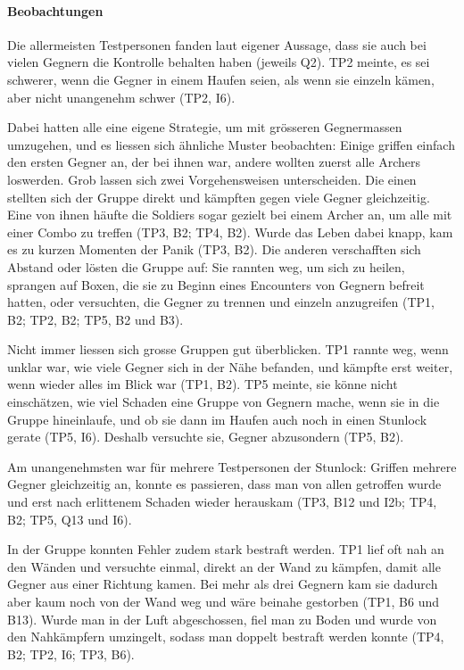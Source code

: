 \documentclass[../Main.tex]{subfiles}
\begin{document}
\paragraph{Beobachtungen}
Die allermeisten Testpersonen fanden laut eigener Aussage, dass sie auch bei vielen Gegnern die Kontrolle behalten haben (jeweils Q2). TP2 meinte, es sei schwerer, wenn die Gegner in einem Haufen seien, als wenn sie einzeln kämen, aber nicht unangenehm schwer (TP2, I6).

Dabei hatten alle eine eigene Strategie, um mit grösseren Gegnermassen umzugehen, und es liessen sich ähnliche Muster beobachten: Einige griffen einfach den ersten Gegner an, der bei ihnen war, andere wollten zuerst alle Archers loswerden. Grob lassen sich zwei Vorgehensweisen unterscheiden. Die einen stellten sich der Gruppe direkt und kämpften gegen viele Gegner gleichzeitig. Eine von ihnen häufte die Soldiers sogar gezielt bei einem Archer an, um alle mit einer Combo zu treffen (TP3, B2; TP4, B2). Wurde das Leben dabei knapp, kam es zu kurzen Momenten der Panik (TP3, B2). Die anderen verschafften sich Abstand oder lösten die Gruppe auf: Sie rannten weg, um sich zu heilen, sprangen auf Boxen, die sie zu Beginn eines Encounters von Gegnern befreit hatten, oder versuchten, die Gegner zu trennen und einzeln anzugreifen (TP1, B2; TP2, B2; TP5, B2 und B3).

Nicht immer liessen sich grosse Gruppen gut überblicken. TP1 rannte weg, wenn unklar war, wie viele Gegner sich in der Nähe befanden, und kämpfte erst weiter, wenn wieder alles im Blick war (TP1, B2). TP5 meinte, sie könne nicht einschätzen, wie viel Schaden eine Gruppe von Gegnern mache, wenn sie in die Gruppe hineinlaufe, und ob sie dann im Haufen auch noch in einen Stunlock gerate (TP5, I6). Deshalb versuchte sie, Gegner abzusondern (TP5, B2).

Am unangenehmsten war für mehrere Testpersonen der Stunlock: Griffen mehrere Gegner gleichzeitig an, konnte es passieren, dass man von allen getroffen wurde und erst nach erlittenem Schaden wieder herauskam (TP3, B12 und I2b; TP4, B2; TP5, Q13 und I6).

In der Gruppe konnten Fehler zudem stark bestraft werden. TP1 lief oft nah an den Wänden und versuchte einmal, direkt an der Wand zu kämpfen, damit alle Gegner aus einer Richtung kamen. Bei mehr als drei Gegnern kam sie dadurch aber kaum noch von der Wand weg und wäre beinahe gestorben (TP1, B6 und B13). Wurde man in der Luft abgeschossen, fiel man zu Boden und wurde von den Nahkämpfern umzingelt, sodass man doppelt bestraft werden konnte (TP4, B2; TP2, I6; TP3, B6).
\end{document}
